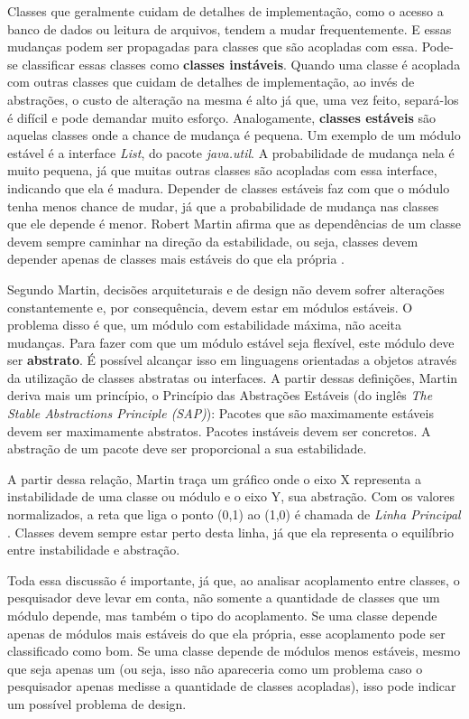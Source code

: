 Classes que geralmente cuidam de detalhes de implementação, como o acesso a
banco de dados ou leitura de arquivos, tendem a mudar frequentemente. E essas
mudanças podem ser propagadas para classes que são acopladas com essa. Pode-se
classificar essas classes como \textbf{classes instáveis}.
Quando uma classe é acoplada com outras classes que cuidam de detalhes de
implementação, ao invés de abstrações, o custo de alteração na mesma é alto já que, uma vez feito,
separá-los é difícil e pode demandar muito esforço. Analogamente,
\textbf{classes estáveis} são aquelas classes onde a chance de mudança é
pequena. Um exemplo de um módulo estável é a interface \textit{List}, do pacote
\textit{java.util}. A probabilidade de mudança nela é muito pequena, já que
muitas outras classes são acopladas com essa interface, indicando que ela é
madura. Depender de classes estáveis faz com que o módulo tenha menos
chance de mudar, já que a probabilidade de mudança nas classes que ele depende
é menor. Robert Martin afirma que as dependências de um classe devem sempre
caminhar na direção da estabilidade, ou seja, classes devem depender apenas de
classes mais estáveis do que ela própria \cite{agile-ppp}.

Segundo Martin, decisões arquiteturais e de design não devem sofrer
alterações constantemente e, por consequência, devem estar em módulos estáveis.
O problema disso é que, um módulo com estabilidade máxima, não aceita mudanças.
Para fazer com que um módulo estável seja flexível, este módulo deve ser
\textbf{abstrato}. É possível alcançar isso em linguagens orientadas a objetos
através da utilização de classes abstratas ou interfaces. 
A partir dessas definições, Martin
deriva mais um princípio, o Princípio das Abstrações Estáveis (do inglês
\textit{The Stable Abstractions Principle (SAP)}): Pacotes que são maximamente
estáveis devem ser maximamente abstratos. Pacotes instáveis devem ser concretos.
A abstração de um pacote deve ser proporcional a sua estabilidade. 

A partir dessa relação, Martin traça um gráfico onde o eixo X representa
a instabilidade de uma classe ou módulo e o eixo Y, sua abstração. Com os
valores normalizados, a reta que liga o ponto (0,1) ao (1,0) é chamada
de \textit{Linha Principal} \cite{agile-ppp}. Classes devem sempre
estar perto desta linha, já que ela representa o equilíbrio entre 
instabilidade e abstração.

Toda essa discussão é importante, já que, ao analisar acoplamento entre classes,
o pesquisador deve levar em conta, não somente a quantidade de classes
que um módulo depende, mas também o tipo do acoplamento. Se uma classe depende
apenas de módulos mais estáveis do que ela própria, esse acoplamento pode ser
classificado como bom. Se uma classe depende de módulos menos estáveis, mesmo
que seja apenas um (ou seja, isso não apareceria como um problema caso o
pesquisador apenas medisse a quantidade de classes acopladas), isso pode indicar
um possível problema de design.

